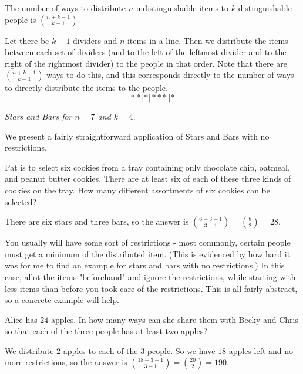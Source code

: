 \documentclass[blue,onecol]{shooting}
\begin{document}
\begin{theo}
The number of ways to distribute $n$ indistinguishable items to $k$ distinguishable people is $\binom{n+k-1}{k-1}.$
\end{theo}

\begin{pro}
Let there be $k-1$ dividers and $n$ items in a line. Then we distribute the items between each set of dividers (and to the left of the leftmost divider and to the right of the rightmost divider) to the people in that order. Note that there are $\binom{n+k-1}{k-1}$ ways to do this, and this corresponds directly to the number of ways to directly distribute the items to the people.
\[**|*|***|*\]
\begin{center}
    \textit{Stars and Bars for $n=7$ and $k=4.$}
\end{center}
\end{pro}

We present a fairly straightforward application of Stars and Bars with no restrictions.

\begin{exam}[AMC 10A 2003/21]
Pat is to select six cookies from a tray containing only chocolate chip, oatmeal, and peanut butter cookies. There are at least six of each of these three kinds of cookies on the tray. How many different assortments of six cookies can be selected?
\end{exam}

\begin{sol}
There are six stars and three bars, so the answer is $\binom{6+3-1}{3-1}=\binom{8}{2}=28.$
\end{sol}

You usually will have some sort of restrictions - most commonly, certain people must get a minimum of the distributed item. (This is evidenced by how hard it was for me to find an example for stars and bars with no restrictions.) In this case, allot the items "beforehand" and ignore the restrictions, while starting with less items than before you took care of the restrictions. This is all fairly abstract, so a concrete example will help.

\begin{exam}[AMC 8 2019/25]
Alice has $24$ apples. In how many ways can she share them with Becky and Chris so that each of the three people has at least two apples?
\end{exam}

\begin{sol}
We distribute $2$ apples to each of the $3$ people. So we have $18$ apples left and no more restrictions, so the answer is $\binom{18+3-1}{3-1}=\binom{20}{2}=190.$
\end{sol}
\end{document}
